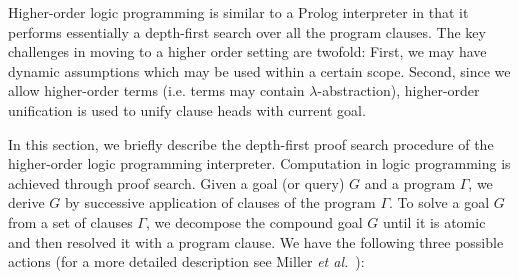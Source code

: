 \documentclass{llncs}
\newcommand{\vd}{\vdash}
\begin{document}
Higher-order logic programming is similar to a Prolog interpreter in
that it performs essentially a depth-first search over all the program
clauses. The key challenges in moving to a higher order setting are
twofold: First, we may have dynamic assumptions which may be
used within a certain scope. Second, since we allow higher-order
terms (i.e. terms may contain $\lambda$-abstraction), higher-order
unification is used to unify clause heads with current goal. 

In this section,  we briefly describe the depth-first proof search
procedure of the higher-order logic programming
interpreter. Computation in logic programming is achieved through
proof search. Given a goal (or query) $G$ and a program $\Gamma$, we
derive $G$ by successive application of clauses of the program
$\Gamma$. 
To solve a goal $G$ from a set of clauses $\Gamma$, we decompose the
compound goal $G$ until it is atomic and then resolved it with a
program clause. We have the following three possible actions (for a
more detailed description see Miller {\em{et al.}}~\cite{Miller91apal}):

\end{document}

